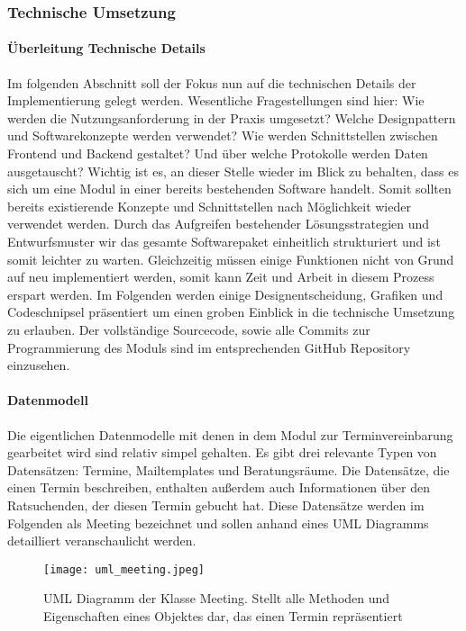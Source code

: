 \subsubsection{Technische Umsetzung}

\paragraph{Überleitung Technische Details}
Im folgenden Abschnitt soll der Fokus nun auf die technischen Details der
Implementierung gelegt werden. Wesentliche Fragestellungen sind hier: Wie
werden die Nutzungsanforderung in der Praxis umgesetzt? Welche Designpattern
und Softwarekonzepte werden verwendet? Wie werden Schnittstellen zwischen
Frontend und Backend gestaltet? Und über welche Protokolle werden Daten
ausgetauscht? Wichtig ist es, an dieser Stelle wieder im Blick zu behalten,
dass es sich um eine Modul in einer bereits bestehenden Software handelt. Somit
sollten bereits existierende Konzepte und Schnittstellen nach Möglichkeit
wieder verwendet werden. Durch das Aufgreifen bestehender Lösungsstrategien und
Entwurfsmuster wir das gesamte Softwarepaket einheitlich strukturiert und ist
somit leichter zu warten. Gleichzeitig müssen einige Funktionen nicht von Grund
auf neu implementiert werden, somit kann Zeit und Arbeit in diesem Prozess
erspart werden.\cite{wiederverwSoftware} Im Folgenden werden einige
Designentscheidung, Grafiken und Codeschnipsel präsentiert um einen groben
Einblick in die technische Umsetzung zu erlauben. Der vollständige Sourcecode,
sowie alle Commits zur Programmierung des Moduls sind im entsprechenden GitHub
Repository einzusehen.\cite{stubegruRepo}

\paragraph{Datenmodell}
Die eigentlichen Datenmodelle mit denen in dem Modul zur Terminvereinbarung
gearbeitet wird sind relativ simpel gehalten. Es gibt drei relevante Typen von
Datensätzen: Termine, Mailtemplates und Beratungsräume. Die Datensätze, die
einen Termin beschreiben, enthalten außerdem auch Informationen über den
Ratsuchenden, der diesen Termin gebucht hat. Diese Datensätze werden im
Folgenden als Meeting bezeichnet und sollen anhand eines UML Diagramms
detailliert veranschaulicht werden.

\begin{figure}[h]
    \caption{UML Diagramm der Klasse Meeting. Stellt alle Methoden und Eigenschaften eines Objektes dar, das einen Termin repräsentiert}
    \centering
    \texttt{[image: uml\_meeting.jpeg]}
\end{figure}

